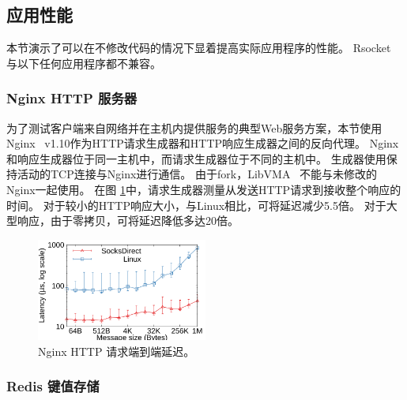 \subsection{应用性能}
\label{socksdirect:subsec:application}


本节演示了\sys {}可以在不修改代码的情况下显着提高实际应用程序的性能。
Rsocket~ \cite {rsockets}与以下任何应用程序都不兼容。

\subsubsection{Nginx HTTP 服务器}



为了测试客户端来自网络并在主机内提供服务的典型Web服务方案，本节使用Nginx~ \cite {nginx} v1.10作为HTTP请求生成器和HTTP响应生成器之间的反向代理。
Nginx和响应生成器位于同一主机中，而请求生成器位于不同的主机中。
生成器使用保持活动的TCP连接与Nginx进行通信。
由于fork，LibVMA~ \cite {libvma}不能与未修改的Nginx一起使用。
在图 \ref {socksdirect:fig:eval-nginx}中，请求生成器测量从发送HTTP请求到接收整个响应的时间。
对于较小的HTTP响应大小，与Linux相比，\sys {}可将延迟减少5.5倍。
对于大型响应，由于零拷贝，\sys {}可将延迟降低多达20倍。

\begin{figure}[htbp]
	\centering \includegraphics[width=0.5\textwidth]{eval/web/msgsize-clocal-lat.pdf}
	
	\caption{Nginx HTTP 请求端到端延迟。}
	\label{socksdirect:fig:eval-nginx}
\end{figure}



\subsubsection{Redis 键值存储}

